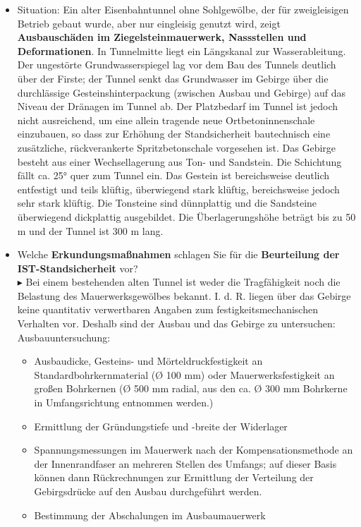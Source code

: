 \documentclass[fleqn,twoside]{article}
\begin{document}
\begin{small}
\begin{itemize}
    \item Situation: Ein alter Eisenbahntunnel ohne Sohlgewölbe, der für zweigleisigen Betrieb gebaut wurde, aber nur eingleisig genutzt wird, zeigt \textbf{Ausbauschäden im Ziegelsteinmauerwerk, Nassstellen und Deformationen}. In Tunnelmitte liegt ein Längskanal zur Wasserableitung. Der ungestörte Grundwasserspiegel lag vor dem Bau des Tunnels deutlich über der Firste; der Tunnel senkt das Grundwasser im Gebirge über die durchlässige Gesteinshinterpackung (zwischen Ausbau und Gebirge) auf das Niveau der Dränagen im Tunnel ab. Der Platzbedarf im Tunnel ist jedoch nicht ausreichend, um eine allein tragende neue Ortbetoninnenschale einzubauen, so dass zur Erhöhung der Standsicherheit bautechnisch eine zusätzliche, rückverankerte Spritzbetonschale vorgesehen ist. Das Gebirge besteht aus einer Wechsellagerung aus Ton- und Sandstein. Die Schichtung fällt ca. 25° quer zum Tunnel ein. Das Gestein ist bereichsweise deutlich entfestigt und teils klüftig, überwiegend stark klüftig, bereichsweise jedoch sehr stark klüftig. Die Tonsteine sind dünnplattig und die Sandsteine überwiegend dickplattig ausgebildet. Die Überlagerungshöhe beträgt bis zu 50 m und der Tunnel ist 300 m lang.
    \item Welche \textbf{Erkundungsmaßnahmen} schlagen Sie für die \textbf{Beurteilung der IST-Standsicherheit} vor?\\
    $\blacktriangleright$ Bei einem bestehenden alten Tunnel ist weder die Tragfähigkeit noch die Belastung des Mauerwerksgewölbes bekannt. I. d. R. liegen über das Gebirge keine quantitativ verwertbaren Angaben zum festigkeitsmechanischen Verhalten vor. Deshalb sind der Ausbau und das Gebirge zu untersuchen:\\
    Ausbauuntersuchung:
    \begin{itemize}
        \item Ausbaudicke, Gesteins- und Mörteldruckfestigkeit an Standardbohrkernmaterial (Ø 100 mm) oder Mauerwerksfestigkeit an großen Bohrkernen (Ø 500 mm radial, aus den ca. Ø 300 mm Bohrkerne in Umfangsrichtung entnommen werden.)
        \item Ermittlung der Gründungstiefe und -breite der Widerlager
        \item Spannungsmessungen im Mauerwerk nach der Kompensationsmethode an der Innenrandfaser an mehreren Stellen des Umfangs; auf dieser Basis können dann Rückrechnungen zur Ermittlung der Verteilung der Gebirgsdrücke auf den Ausbau durchgeführt werden.
        \item Bestimmung der Abschalungen im Ausbaumauerwerk

\end{itemize}
\end{itemize}
\end{small}
\end{document}
